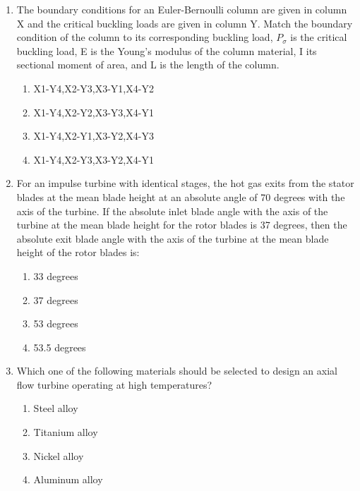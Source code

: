 \documentclass[journal]{IEEEtran}
\numberwithin{equation}{enumi}
\numberwithin{figure}{enumi}
\begin{document}
\begin{enumerate}[start=35]
    \item  The boundary conditions for an Euler-Bernoulli column are given in column X and the critical buckling loads are given in column Y. Match the boundary condition of the column to its corresponding buckling load, $P_\sigma$ is the critical buckling load, E is the Young's modulus of the column material, I its sectional moment of area, and L is the length of the column.\\
    \begin{table}[h!]
    \centering
    
    \caption{}
    \end{table}
    \begin{enumerate}
    \item X1-Y4,X2-Y3,X3-Y1,X4-Y2
    \item X1-Y4,X2-Y2,X3-Y3,X4-Y1
    \item X1-Y4,X2-Y1,X3-Y2,X4-Y3
    \item X1-Y4,X2-Y3,X3-Y2,X4-Y1
    \end{enumerate}

    \item For an impulse turbine with identical stages, the hot gas exits from the stator blades at the mean blade height at an absolute angle of 70 degrees with the axis of the turbine. If the absolute inlet blade angle with the axis of the turbine at the mean blade height for the rotor blades is 37 degrees, then the absolute exit blade angle with the axis of the turbine at the mean blade height of the rotor blades is:
    \begin{enumerate}
        \item 33 degrees
        \item 37 degrees
        \item 53 degrees
        \item 53.5 degrees
    \end{enumerate}

    \item Which one of the following materials should be selected to design an axial flow turbine operating at high temperatures?
    \begin{enumerate}
        \item Steel alloy
        \item Titanium alloy
        \item Nickel alloy
        \item Aluminum alloy
    \end{enumerate}


\end{enumerate}
\end{document}
